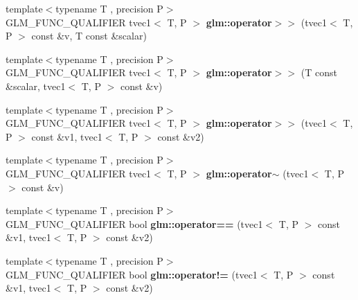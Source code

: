 \begin{DoxyCompactItemize}
\item 
\hypertarget{namespaceglm_a30e6e8720b3eb1d710eb0f8a20b6192d}{{\footnotesize template$<$typename T , precision P$>$ }\\G\-L\-M\-\_\-\-F\-U\-N\-C\-\_\-\-Q\-U\-A\-L\-I\-F\-I\-E\-R tvec1$<$ T, P $>$ {\bfseries glm\-::operator$>$$>$} (tvec1$<$ T, P $>$ const \&v, T const \&scalar)}\label{namespaceglm_a30e6e8720b3eb1d710eb0f8a20b6192d}

\item 
\hypertarget{namespaceglm_a347fdabf5b6193810a25b360a57a02a7}{{\footnotesize template$<$typename T , precision P$>$ }\\G\-L\-M\-\_\-\-F\-U\-N\-C\-\_\-\-Q\-U\-A\-L\-I\-F\-I\-E\-R tvec1$<$ T, P $>$ {\bfseries glm\-::operator$>$$>$} (T const \&scalar, tvec1$<$ T, P $>$ const \&v)}\label{namespaceglm_a347fdabf5b6193810a25b360a57a02a7}

\item 
\hypertarget{namespaceglm_adbb2f50e95ea7aa74355eb231a305436}{{\footnotesize template$<$typename T , precision P$>$ }\\G\-L\-M\-\_\-\-F\-U\-N\-C\-\_\-\-Q\-U\-A\-L\-I\-F\-I\-E\-R tvec1$<$ T, P $>$ {\bfseries glm\-::operator$>$$>$} (tvec1$<$ T, P $>$ const \&v1, tvec1$<$ T, P $>$ const \&v2)}\label{namespaceglm_adbb2f50e95ea7aa74355eb231a305436}

\item 
\hypertarget{namespaceglm_abf218640e6cefd3d973d4cdce34795ff}{{\footnotesize template$<$typename T , precision P$>$ }\\G\-L\-M\-\_\-\-F\-U\-N\-C\-\_\-\-Q\-U\-A\-L\-I\-F\-I\-E\-R tvec1$<$ T, P $>$ {\bfseries glm\-::operator$\sim$} (tvec1$<$ T, P $>$ const \&v)}\label{namespaceglm_abf218640e6cefd3d973d4cdce34795ff}

\item 
\hypertarget{namespaceglm_a1903ed3e722222dd83e25a2f6a82782c}{{\footnotesize template$<$typename T , precision P$>$ }\\G\-L\-M\-\_\-\-F\-U\-N\-C\-\_\-\-Q\-U\-A\-L\-I\-F\-I\-E\-R bool {\bfseries glm\-::operator==} (tvec1$<$ T, P $>$ const \&v1, tvec1$<$ T, P $>$ const \&v2)}\label{namespaceglm_a1903ed3e722222dd83e25a2f6a82782c}

\item 
\hypertarget{namespaceglm_adbcfa5a99a45ab48706d1c04b364aad7}{{\footnotesize template$<$typename T , precision P$>$ }\\G\-L\-M\-\_\-\-F\-U\-N\-C\-\_\-\-Q\-U\-A\-L\-I\-F\-I\-E\-R bool {\bfseries glm\-::operator!=} (tvec1$<$ T, P $>$ const \&v1, tvec1$<$ T, P $>$ const \&v2)}\label{namespaceglm_adbcfa5a99a45ab48706d1c04b364aad7}

\end{DoxyCompactItemize}


